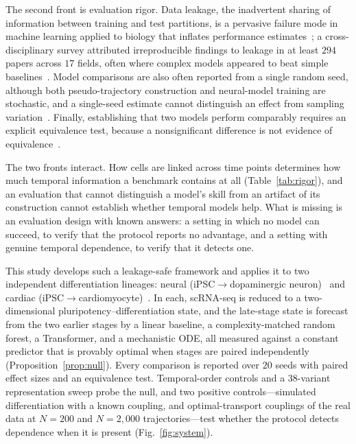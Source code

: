 \documentclass[10pt,journal,compsoc]{IEEEtran}
\begin{document}
The second front is evaluation rigor. Data leakage, the inadvertent sharing of information between training and test partitions, is a pervasive failure mode in machine learning applied to biology that inflates performance estimates~\cite{whalen2022navigating,bernett2024guiding}; a cross-disciplinary survey attributed irreproducible findings to leakage in at least $294$ papers across $17$ fields, often where complex models appeared to beat simple baselines~\cite{kapoor2023leakage}. Model comparisons are also often reported from a single random seed, although both pseudo-trajectory construction and neural-model training are stochastic, and a single-seed estimate cannot distinguish an effect from sampling variation~\cite{pineau2021improving}. Finally, establishing that two models perform comparably requires an explicit equivalence test, because a nonsignificant difference is not evidence of equivalence~\cite{lakens2017equivalence}.

The two fronts interact. How cells are linked across time points determines how much temporal information a benchmark contains at all (Table~\ref{tab:rigor}), and an evaluation that cannot distinguish a model's skill from an artifact of its construction cannot establish whether temporal models help. What is missing is an evaluation design with known answers: a setting in which no model can succeed, to verify that the protocol reports no advantage, and a setting with genuine temporal dependence, to verify that it detects one.

This study develops such a leakage-safe framework and applies it to two independent differentiation lineages: neural (iPSC$\rightarrow$dopaminergic neuron)~\cite{jerber2021population} and cardiac (iPSC$\rightarrow$cardiomyocyte)~\cite{elorbany2022single}. In each, scRNA-seq is reduced to a two-dimensional pluripotency--differentiation state, and the late-stage state is forecast from the two earlier stages by a linear baseline, a complexity-matched random forest, a Transformer, and a mechanistic ODE, all measured against a constant predictor that is provably optimal when stages are paired independently (Proposition~\ref{prop:null}). Every comparison is reported over $20$ seeds with paired effect sizes and an equivalence test. Temporal-order controls and a $38$-variant representation sweep probe the null, and two positive controls---simulated differentiation with a known coupling, and optimal-transport couplings of the real data at $N=200$ and $N=2{,}000$ trajectories---test whether the protocol detects dependence when it is present (Fig.~\ref{fig:system}).
\end{document}
